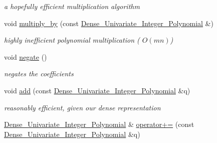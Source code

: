 \begin{Indent}
\begin{DoxyCompactItemize}
\begin{DoxyCompactList}\small\item\em a hopefully efficient multiplication algorithm \end{DoxyCompactList}\item 
\mbox{\label{class_dense___univariate___integer___polynomial_a8c06ba1749b4197a9e1676cfeb87134e}} 
void \hyperlink{class_dense___univariate___integer___polynomial_a8c06ba1749b4197a9e1676cfeb87134e}{multiply\+\_\+by} (const \hyperlink{class_dense___univariate___integer___polynomial}{Dense\+\_\+\+Univariate\+\_\+\+Integer\+\_\+\+Polynomial} \&)
\begin{DoxyCompactList}\small\item\em highly inefficient polynomial multiplication ( $O(mn)$) \end{DoxyCompactList}\item 
\mbox{\label{class_dense___univariate___integer___polynomial_ab3fd69e979b7b369064a3188e6b8a650}} 
void \hyperlink{class_dense___univariate___integer___polynomial_ab3fd69e979b7b369064a3188e6b8a650}{negate} ()
\begin{DoxyCompactList}\small\item\em negates the coefficients \end{DoxyCompactList}\item 
\mbox{\label{class_dense___univariate___integer___polynomial_a9aed4c0d2f30a93f79a11f8ab102601f}} 
void \hyperlink{class_dense___univariate___integer___polynomial_a9aed4c0d2f30a93f79a11f8ab102601f}{add} (const \hyperlink{class_dense___univariate___integer___polynomial}{Dense\+\_\+\+Univariate\+\_\+\+Integer\+\_\+\+Polynomial} \&q)
\begin{DoxyCompactList}\small\item\em reasonably efficient, given our dense representation \end{DoxyCompactList}\item 
\hyperlink{class_dense___univariate___integer___polynomial}{Dense\+\_\+\+Univariate\+\_\+\+Integer\+\_\+\+Polynomial} \& \hyperlink{class_dense___univariate___integer___polynomial_ad3fcc4a1885e52b7c6c1814aac13b7b0}{operator+=} (const \hyperlink{class_dense___univariate___integer___polynomial}{Dense\+\_\+\+Univariate\+\_\+\+Integer\+\_\+\+Polynomial} \&q)
\end{DoxyCompactItemize}
\end{Indent}
